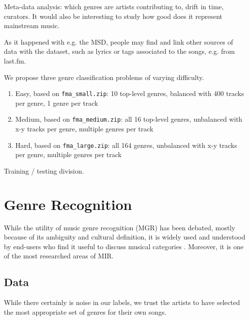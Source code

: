 \documentclass{article}
\begin{document}
Meta-data analysis: which genres are artists contributing to, drift in time, curators.
It would also be interesting to study how good does it represent mainstream music.

As it happened with e.g. the MSD, people may find and link other sources of data with the dataset, such as lyrics or tags associated to the songs, e.g. from last.fm.

We propose three genre classification problems of varying difficulty.

\begin{enumerate}
	\item Easy, based on \texttt{fma\_small.zip}: 10 top-level genres, balanced with 400 tracks per genre, 1 genre per track
	\item Medium, based on \texttt{fma\_medium.zip}: all 16 top-level genres, unbalanced with x-y tracks per genre, multiple genres per track
	\item Hard, based on \texttt{fma\_large.zip}: all 164 genres, unbalanced with x-y tracks per genre, multiple genres per track
\end{enumerate}

Training / testing division.


\section{Genre Recognition} %



While the utility of music genre recognition (MGR) has been debated, mostly because of its ambiguity and cultural definition, it is widely used and understood by end-users who find it useful to discuss musical categories \cite{mgr_why}. Moreover, it is one of the most researched areas of MIR.

\subsection{Data}

While there certainly is noise in our labels, we trust the artists to have selected the most appropriate set of genres for their own songs.
\end{document}
